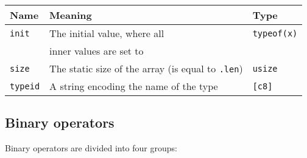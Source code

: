 \begin{center}\begin{adjustbox}{max width=\linewidth}
  \begin{tabular}{|l|ll|}
    \hline
    Name & Meaning & Type\\
    \hline
    \hline
    \texttt{init} & The initial value, where all & \texttt{typeof(x)} \\
    & inner values are set to  & \\
    \Xhline{0.001pt}
    \texttt{size} & The static size of the array (is equal to \texttt{.len}) & \texttt{usize} \\
    \hline
    \texttt{typeid} & A string encoding the name of the type & \texttt{[c8]} \\
    \hline
  \end{tabular}
\end{adjustbox}\end{center}

\subsection {Binary operators}

Binary operators are divided into four groups:

